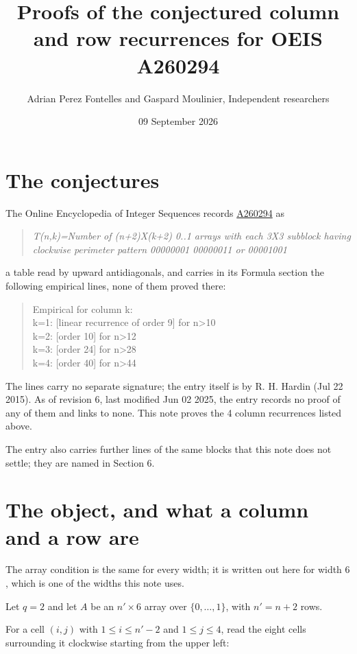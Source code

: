 \documentclass[11pt]{article}
\title{Proofs of the conjectured column and row recurrences for OEIS A260294}
\author{Adrian Perez Fontelles and Gaspard Moulinier, Independent researchers}
\date{09 September 2026}
\theoremstyle{definition}
\begin{document}
\maketitle
\section{The conjectures}

The Online Encyclopedia of Integer Sequences records \href{https://oeis.org/A260294}{A260294} as

\begin{quote}\itshape T(n,k)=Number of (n+2)X(k+2) 0..1 arrays with each 3X3 subblock having clockwise perimeter pattern 00000001 00000011 or 00001001\end{quote}

a table read by upward antidiagonals, and carries in its Formula section the following empirical lines, none of them proved there:

\begin{quote}\ttfamily Empirical for column k:\\
k=1: [linear recurrence of order 9] for n>10\\k=2: [order 10] for n>12\\k=3: [order 24] for n>28\\k=4: [order 40] for n>44\end{quote}

The lines carry no separate signature; the entry itself is by R. H. Hardin (Jul 22 2015). As of revision 6, last modified Jun 02 2025, the entry records no proof of any of them and links to none. This note proves the 4 column recurrences listed above.

The entry also carries further lines of the same blocks that this note does not settle; they are named in Section 6.

\section{The object, and what a column and a row are}

The array condition is the same for every width; it is written out here for width $6$, which is one of the widths this note uses.

Let $q = 2$ and let $A$ be an $n' \times 6$ array over $\{0,\dots,1\}$, with $n' = n + 2$ rows.

For a cell $(i,j)$ with $1 \le i \le n'-2$ and $1 \le j \le 4$, read the eight cells surrounding it clockwise starting from the upper left:
\end{document}
